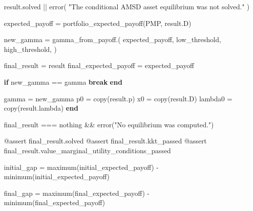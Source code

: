 \documentclass[
  letterpaper,
  DIV=11,
  numbers=noendperiod]{scrreprt}
\newenvironment{Shaded}{\begin{snugshade}}{\end{snugshade}}
\newcommand{\ConstantTok}[1]{\textcolor[rgb]{0.56,0.35,0.01}{#1}}
\newcommand{\ControlFlowTok}[1]{\textcolor[rgb]{0.00,0.23,0.31}{\textbf{#1}}}
\newcommand{\FunctionTok}[1]{\textcolor[rgb]{0.28,0.35,0.67}{#1}}
\newcommand{\NormalTok}[1]{\textcolor[rgb]{0.00,0.23,0.31}{#1}}
\newcommand{\OperatorTok}[1]{\textcolor[rgb]{0.37,0.37,0.37}{#1}}
\newcommand{\PreprocessorTok}[1]{\textcolor[rgb]{0.68,0.00,0.00}{#1}}
\newcommand{\StringTok}[1]{\textcolor[rgb]{0.13,0.47,0.30}{#1}}
\begin{document}
\begin{codelisting}
{\begin{Shaded}
\begin{Highlighting}[]
\NormalTok{        result.solved }\OperatorTok{||} \FunctionTok{error}\NormalTok{(}
            \StringTok{"The conditional AMSD asset equilibrium was not solved."}
\NormalTok{        )}

\NormalTok{        expected\_payoff }\OperatorTok{=}
            \FunctionTok{portfolio\_expected\_payoff}\NormalTok{(PMP, result.D)}

\NormalTok{        new\_gamma }\OperatorTok{=}
            \FunctionTok{gamma\_from\_payoff}\NormalTok{.(}
\NormalTok{                expected\_payoff,}
\NormalTok{                low\_threshold,}
\NormalTok{                high\_threshold,}
\NormalTok{            )}

\NormalTok{        final\_result }\OperatorTok{=}\NormalTok{ result}
\NormalTok{        final\_expected\_payoff }\OperatorTok{=}\NormalTok{ expected\_payoff}

        \ControlFlowTok{if}\NormalTok{ new\_gamma }\OperatorTok{==}\NormalTok{ gamma}
            \ControlFlowTok{break}
        \ControlFlowTok{end}

\NormalTok{        gamma }\OperatorTok{=}\NormalTok{ new\_gamma}
\NormalTok{        p0 }\OperatorTok{=} \FunctionTok{copy}\NormalTok{(result.p)}
\NormalTok{        x0 }\OperatorTok{=} \FunctionTok{copy}\NormalTok{(result.D)}
\NormalTok{        lambda0 }\OperatorTok{=} \FunctionTok{copy}\NormalTok{(result.lambda)}
    \ControlFlowTok{end}

\NormalTok{    final\_result }\OperatorTok{===} \ConstantTok{nothing} \OperatorTok{\&\&}
        \FunctionTok{error}\NormalTok{(}\StringTok{"No equilibrium was computed."}\NormalTok{)}

    \PreprocessorTok{@assert}\NormalTok{ final\_result.solved}
    \PreprocessorTok{@assert}\NormalTok{ final\_result.kkt\_passed}
    \PreprocessorTok{@assert}\NormalTok{ final\_result.value\_marginal\_utility\_conditions\_passed}

\NormalTok{    initial\_gap }\OperatorTok{=}
        \FunctionTok{maximum}\NormalTok{(initial\_expected\_payoff) }\OperatorTok{{-}}
        \FunctionTok{minimum}\NormalTok{(initial\_expected\_payoff)}

\NormalTok{    final\_gap }\OperatorTok{=}
        \FunctionTok{maximum}\NormalTok{(final\_expected\_payoff) }\OperatorTok{{-}}
        \FunctionTok{minimum}\NormalTok{(final\_expected\_payoff)}


\end{Highlighting}
\end{Shaded}}
\end{codelisting}
\end{document}
